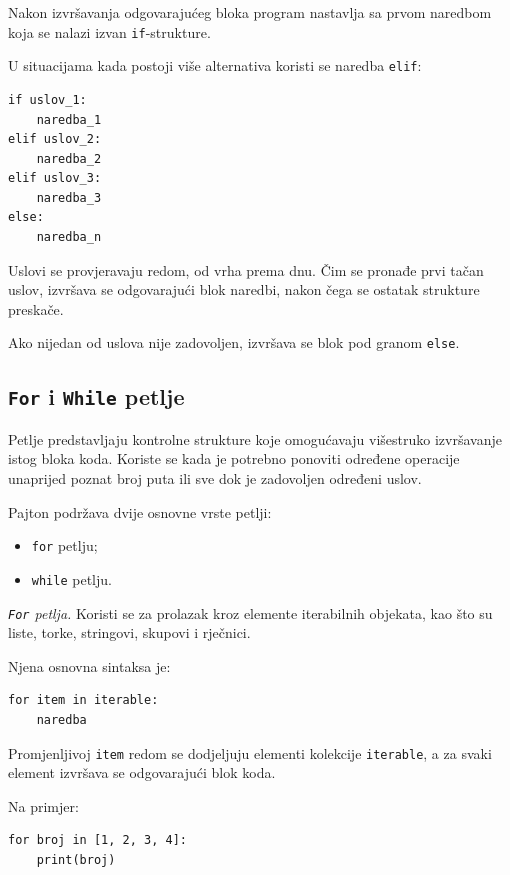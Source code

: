 Nakon izvršavanja odgovarajućeg bloka program nastavlja sa prvom naredbom koja se nalazi izvan \texttt{if}-strukture.

U situacijama kada postoji više alternativa koristi se naredba \texttt{elif}:

\begin{verbatim}
if uslov_1:
    naredba_1
elif uslov_2:
    naredba_2
elif uslov_3:
    naredba_3
else:
    naredba_n
\end{verbatim}

Uslovi se provjeravaju redom, od vrha prema dnu. Čim se pronađe prvi tačan uslov, izvršava se odgovarajući blok naredbi, nakon čega se ostatak strukture preskače.

Ako nijedan od uslova nije zadovoljen, izvršava se blok pod granom \texttt{else}.

\subsection{\texttt{For} i \texttt{While} petlje}

Petlje predstavljaju kontrolne strukture koje omogućavaju višestruko izvršavanje istog bloka koda. Koriste se kada je potrebno ponoviti određene operacije unaprijed poznat broj puta ili sve dok je zadovoljen određeni uslov.

Pajton podržava dvije osnovne vrste petlji:

\begin{itemize}
	\item \texttt{for} petlju;
	\item \texttt{while} petlju.
\end{itemize}

\textit{\texttt{For} petlja.}  Koristi se za prolazak kroz elemente iterabilnih objekata, kao što su liste, torke, stringovi, skupovi i rječnici.

Njena osnovna sintaksa je:

\begin{verbatim}
for item in iterable:
    naredba
\end{verbatim}

Promjenljivoj \texttt{item} redom se dodjeljuju elementi kolekcije \texttt{iterable}, a za svaki element izvršava se odgovarajući blok koda.

Na primjer:

\begin{verbatim}
for broj in [1, 2, 3, 4]:
    print(broj)
\end{verbatim}

